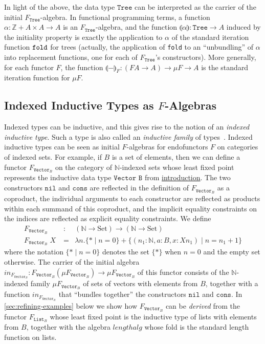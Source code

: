 \documentclass{LMCS}
\newcommand{\tyname}[1]{\texttt{#1}}
\newcommand{\inn}{\mathit{in}}
\newcommand{\sepbar}{\mathrel|}
\newcommand{\fold}[1]{\llparenthesis #1 \rrparenthesis}
\newcommand{\Set}{\mathrm{Set}}
\begin{document}
In light of the above, the data type $\tyname{Tree}$ can be
interpreted as the carrier of the initial
$F_{\tyname{Tree}}$-algebra. In functional programming terms, a
function $\alpha : \mathbb{Z} + A \times A \to A$ is an
$F_{\tyname{Tree}}$-algebra, and the function $\fold{\alpha} :
\tyname{Tree} \to A$ induced by the initiality property is exactly the
application to $\alpha$ of the standard iteration function
$\verb|fold|$ for trees (actually, the application of \verb|fold| to
an ``unbundling'' of $\alpha$ into replacement functions, one for each
of $F_{\tyname{Tree}}$'s constructors). More generally, for each
functor $F$, the function $\fold{-}_F : (F A \to A) \to \mu F \to A$
is the standard iteration function for $\mu F$.

\subsection{Indexed Inductive Types as
  $F$-Algebras}\label{sec:indexed-ind-types}  

Indexed types can be inductive, and this gives rise to the notion of
an {\em indexed inductive type}. Such a type is also called an {\em
  inductive family} of types~\cite{dybjer94inductive}. Indexed
inductive types can be seen as initial $F$-algebras for endofunctors
$F$ on categories of indexed sets. For example, if $B$ is a set of
elements, then we can define a functor $F_{\tyname{Vector}_B}$ on the
category of $\mathbb{N}$-indexed sets whose least fixed point
represents the inductive data type $\tyname{Vector B}$ from
\hyperref[sec:introduction]{introduction}. The two constructors
$\texttt{nil}$ and $\texttt{cons}$ are reflected in the definition of
$F_{\tyname{Vector}_B}$ as a coproduct, the individual arguments to
each constructor are reflected as products within each summand of this
coproduct, and the implicit equality constraints on the indices are
reflected as explicit equality constraints. We define
\begin{eqnarray*}
F_{\tyname{Vector}_B} & : & (\mathbb{N} \to \Set) \to
(\mathbb{N} \to \Set)\\ 
 F_{\tyname{Vector}_B}\; X \;
 &=& \lambda n. \{* \sepbar n = 0\} + \{ (n_1 : \mathbb{N}, a : B, x : X n_1) \sepbar n = n_1 + 1 \}
\end{eqnarray*}
where the notation $\{* \sepbar n = 0\}$ denotes the set $\{*\}$ when
$n = 0$ and the empty set otherwise.  The carrier of the initial
algebra $\inn_{F_{\tyname{Vector}_B}} : F_{\tyname{Vector}_B}(\mu
F_{\tyname{Vector}_B}) \to \mu F_{\tyname{Vector}_B}$ of this functor
consists of the $\mathbb{N}$-indexed family $\mu
F_{\tyname{Vector}_B}$ of sets of vectors with elements from $B$,
together with a function $\inn_{F_{\tyname{Vector}_B}}$ that ``bundles
together'' the constructors $\texttt{nil}$ and $\texttt{cons}$. In
\autoref{sec:refining-examples} below we show how
$F_{\tyname{Vector}_B}$ can be \emph{derived} from the functor
$F_{\tyname{List}_B}$ whose least fixed point is the inductive type of
lists with elements from $B$, together with the algebra
$\mathit{lengthalg}$ whose fold is the standard length function on
lists.
\end{document}
